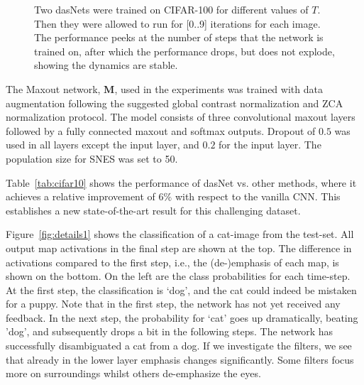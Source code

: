 \begin{figure}[t]
\begin{minipage}[b]{0.4\linewidth}
\caption{Two dasNets were trained on CIFAR-100 for different values of $T$.
Then they were allowed to run for [0..9] iterations for each image. 
The performance peeks at the number of steps that the network is trained on, 
after which the performance drops, but does not explode, showing the dynamics are stable.}
\label{fig:1step2step}
\end{minipage}
\hspace{0.5cm}
\end{figure}





The Maxout network, $\mathbf{M}$, used in the experiments was trained
with data augmentation following the suggested global contrast
normalization and ZCA normalization protocol.  The model consists of
three convolutional maxout layers followed by a fully connected maxout
and softmax outputs. Dropout of $0.5$ was used in all layers except the
input layer, and $0.2$ for the input layer.  The population size for
SNES was set to 50.



Table~\ref{tab:cifar10} shows the performance of dasNet vs. other
methods, where it achieves a relative improvement of $6\%$ with
respect to the vanilla CNN.  This establishes a new state-of-the-art
result for this challenging dataset.

Figure~\ref{fig:details1} shows the classification of a cat-image from
the test-set.  All output map activations in the final step are shown
at the top. The difference in activations compared to the first step,
i.e., the (de-)emphasis of each map, is shown on the bottom. On the
left are the class probabilities for each time-step. At the first
step, the classification is `dog', and the cat could indeed be mistaken
for a puppy. Note that in the first step, the network has not yet
received any feedback.  In the next step, the probability for `cat' goes up
dramatically, beating 'dog', and subsequently drops a bit in the
following steps.  The network has successfully disambiguated a cat
from a dog. If we investigate the filters, we see that already in the
lower layer emphasis changes significantly. Some filters focus more on
surroundings whilst others de-emphasize the eyes. %

